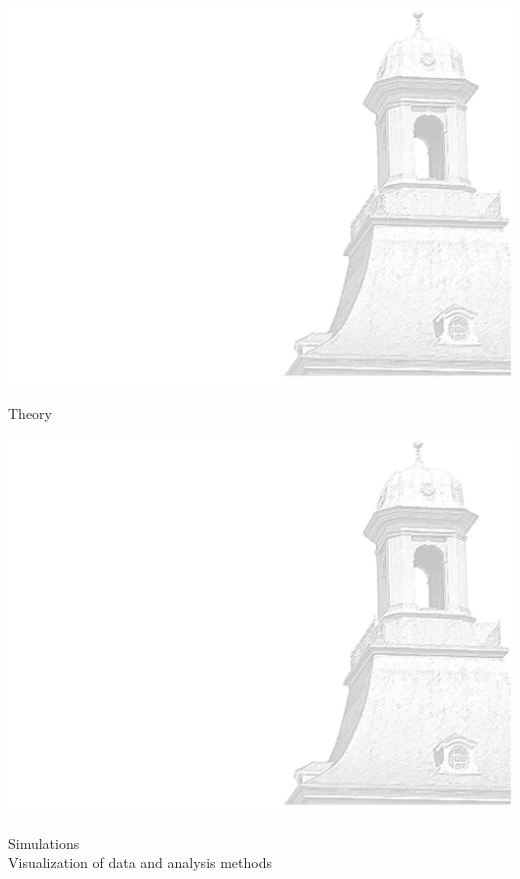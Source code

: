 \documentclass[xcolor=dvipsnames]{beamer}
\begin{document}
    
    {\usebackgroundtemplate%
        {%
            \includegraphics[width=\paperwidth,height=\paperheight]{bkg1.pdf}%
        }
        \begin{frame}
            \centering \Huge \color{ublue} Theory
            \thispagestyle{empty}
            \addtocounter{framenumber}{-1}
        \end{frame}
    }
    
    {\usebackgroundtemplate%
        {%
            \includegraphics[width=\paperwidth,height=\paperheight]{bkg1.pdf}%
        }
        \begin{frame}
            \centering \Huge \color{ublue} Simulations \\ \Large Visualization of data and analysis methods
            \thispagestyle{empty}
            \addtocounter{framenumber}{-1}
        \end{frame}
    }
    
\end{document}

